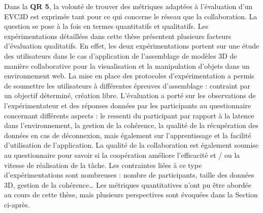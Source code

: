 %
Dans la \textbf{QR 5}, la volonté de trouver des métriques adaptées à l'évaluation 
d'un \gls{EVC3D} est exprimée tant pour ce qui concerne le réseau que la 
collaboration. La 
question se pose à la fois en termes quantitatifs et qualitatifs.
Les expérimentations détaillées dans cette thèse présentent plusieurs facteurs 
d'évaluation qualitatifs. En effet, les deux expérimentations portent sur une étude 
des utilisateurs dans le cas d'application de l'assemblage de modèles 3D de 
manière collaborative pour la visualisation et la manipulation d'objets dans un 
environnement web.
La mise en place des protocoles d'expérimentation a permis de soumettre les 
utilisateurs à différentes épreuves d'assemblage : contraint par un objectif 
déterminé, création libre. 
L'évaluation a porté sur les observations de l'expérimentateur et des réponses 
données par les participants au questionnaire concernant différents aspects : le 
ressenti du participant par rapport à la latence dans l'environnement, la gestion de 
la cohérence, la qualité de la récupération des données en cas de déconnexion, 
mais également sur l'apprentissage et la facilité d'utilisation de l'application. La 
qualité de la collaboration est également soumise au questionnaire pour savoir si 
la coopération améliore l'efficacité et / ou la vitesse de réalisation de la tâche.
Les contraintes liées à ce type d'expérimentations sont nombreuses : nombre de 
participants, taille des données 3D, gestion de la cohérence\dots 
Les métriques quantitatives n'ont pu être abordée au cours de cette thèse, mais 
plusieurs perspectives sont évoquées dans la Section  
ci-après.


